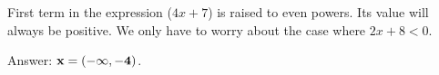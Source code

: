 \documentclass[answers,addpoints]{exam}
\begin{document}
\begin{questions}
\begin{parts}
\begin{solution}
    First term in the expression ($4x+7$) is raised to even powers.
    Its value will always be positive. We only have to worry about the case where
    $2x+8<0$.  

    Answer: $\bf x = (-\infty, -4)$.  


\end{solution}

\end{parts}

\end{questions}
\end{document}
